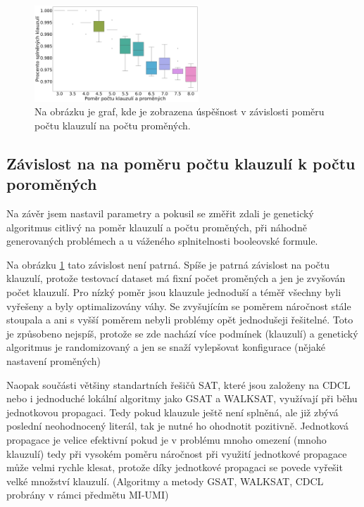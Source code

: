 \documentclass[11pt]{article}
\begin{document}
\begin{figure}
\begin{center}
\includegraphics[width=0.55\textwidth]{img/boxRatio.pdf} 
\caption{Na obrázku je graf, kde je zobrazena úspěšnost v závislosti poměru počtu klauzulí na počtu proměných.}
\label{fig:box}
\end{center}
\end{figure}

\pagebreak

\subsection{Závislost na na poměru počtu klauzulí k počtu poroměných}
Na závěr jsem nastavil parametry a pokusil se změřit zdali je genetický algoritmus citlivý na poměr klauzulí a počtu proměných, při náhodně generovaných problémech a u váženého splnitelnosti booleovské formule.

Na obrázku \ref{fig:box} tato závislost není patrná. Spíše je patrná závislost na počtu klauzulí, protože testovací dataset má fixní počet proměných a jen je zvyšován počet klauzulí. Pro nízký poměr jsou klauzule jednoduší a téměř všechny byli vyřešeny a byly optimalizovány váhy. Se zvyšujícím se poměrem náročnost stále stoupala a ani s vyšší poměrem nebyli problémy opět jednodušeji řešitelné. Toto je způsobeno nejspíš, protože se zde nachází více podmínek (klauzulí) a genetický algoritmus je randomizovaný a jen se snaží vylepšovat konfigurace (nějaké nastavení proměných) 

Naopak součásti většiny standartních řešičů SAT, které jsou založeny na CDCL nebo i jednoduché lokální algoritmy jako GSAT a WALKSAT, využívají při běhu jednotkovou propagaci. Tedy pokud klauzule ještě není splněná, ale již zbývá poslední neohodnocený literál, tak je nutné ho ohodnotit pozitivně. Jednotková propagace je velice efektivní pokud je v problému mnoho omezení (mnoho klauzulí) tedy při vysokém poměru náročnost při využití jednotkové propagace může velmi rychle klesat, protože díky jednotkové propagaci se povede vyřešit velké množství klauzulí. (Algoritmy a metody GSAT, WALKSAT, CDCL probrány v rámci předmětu MI-UMI)
\end{document}

